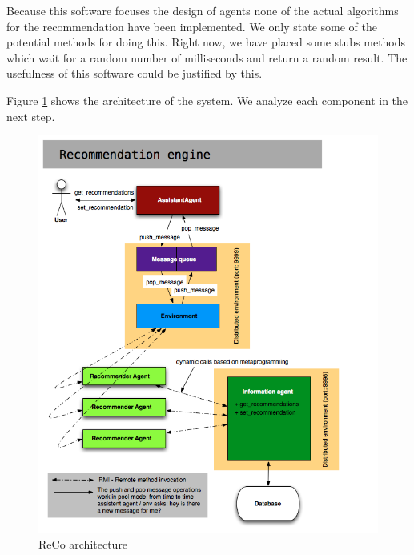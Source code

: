 \documentclass[11pt,a4paper]{article} %
\begin{document}
Because this software focuses the design of agents none of the actual algorithms for the recommendation have been implemented. We only state some of the potential methods for doing this. Right now, we have placed some stubs methods which wait for a random number of milliseconds and return a random result. The usefulness of this software could be justified by this.

Figure \ref{fig:arch} shows the architecture of the system. We analyze each component in the next step.

\begin{figure}
    \begin{center}
        \includegraphics[scale=0.7]{architecture}
        \caption{\small{ReCo architecture}\label{fig:arch}}
    \end{center}
\end{figure}
\end{document}
